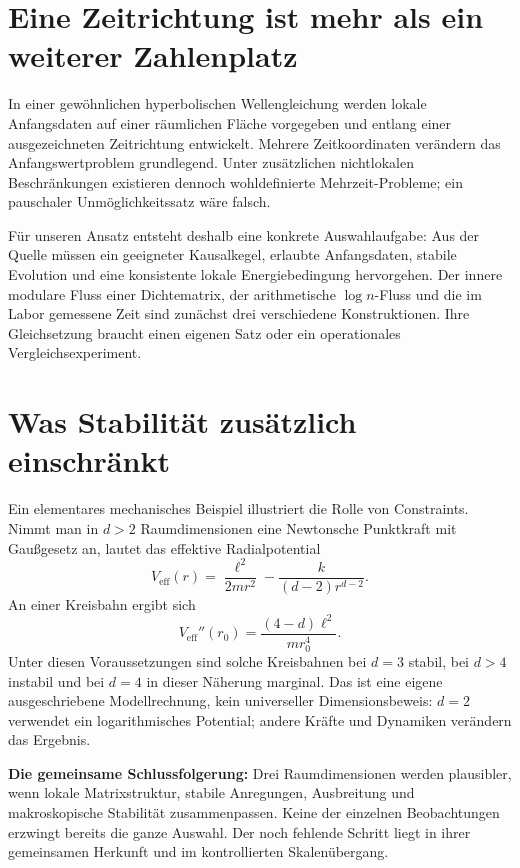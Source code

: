 \section{Eine Zeitrichtung ist mehr als ein weiterer Zahlenplatz}
In einer gewöhnlichen hyperbolischen Wellengleichung werden lokale Anfangsdaten auf einer räumlichen Fläche vorgegeben und entlang einer ausgezeichneten Zeitrichtung entwickelt. Mehrere Zeitkoordinaten verändern das Anfangswertproblem grundlegend. Unter zusätzlichen nichtlokalen Beschränkungen existieren dennoch wohldefinierte Mehrzeit-Probleme; ein pauschaler Unmöglichkeitssatz wäre falsch. 

Für unseren Ansatz entsteht deshalb eine konkrete Auswahlaufgabe: Aus der Quelle müssen ein geeigneter Kausalkegel, erlaubte Anfangsdaten, stabile Evolution und eine konsistente lokale Energiebedingung hervorgehen. Der innere modulare Fluss einer Dichtematrix, der arithmetische $\log n$-Fluss und die im Labor gemessene Zeit sind zunächst drei verschiedene Konstruktionen. Ihre Gleichsetzung braucht einen eigenen Satz oder ein operationales Vergleichsexperiment.

\section{Was Stabilität zusätzlich einschränkt}
Ein elementares mechanisches Beispiel illustriert die Rolle von Constraints. Nimmt man in $d>2$ Raumdimensionen eine Newtonsche Punktkraft mit Gaußgesetz an, lautet das effektive Radialpotential
\[
 V_{\mathrm{eff}}(r)=\frac{\ell^2}{2mr^2}-\frac{k}{(d-2)r^{d-2}}.
\]
An einer Kreisbahn ergibt sich
\[
 V_{\mathrm{eff}}''(r_0)=\frac{(4-d)\ell^2}{mr_0^4}.
\]
Unter diesen Voraussetzungen sind solche Kreisbahnen bei $d=3$ stabil, bei $d>4$ instabil und bei $d=4$ in dieser Näherung marginal. Das ist eine eigene ausgeschriebene Modellrechnung, kein universeller Dimensionsbeweis: $d=2$ verwendet ein logarithmisches Potential; andere Kräfte und Dynamiken verändern das Ergebnis.

\textbf{Die gemeinsame Schlussfolgerung:} Drei Raumdimensionen werden plausibler, wenn lokale Matrixstruktur, stabile Anregungen, Ausbreitung und makroskopische Stabilität zusammenpassen. Keine der einzelnen Beobachtungen erzwingt bereits die ganze Auswahl. Der noch fehlende Schritt liegt in ihrer gemeinsamen Herkunft und im kontrollierten Skalenübergang.
